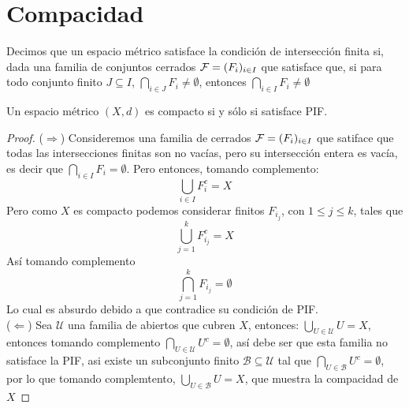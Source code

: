 \documentclass[12pt,a4paper]{book}
\begin{document}
\section{Compacidad}
\begin{defi}
Decimos que un espacio métrico satisface la condición de intersección finita si, dada una familia de conjuntos cerrados $\mathcal{F} = (F_i)_{i \in I}$
que satisface que, si para todo conjunto finito $J \subseteq I$, $\displaystyle \bigcap_{i \in J} F_i \neq \emptyset$, 
entonces $\displaystyle \bigcap_{i \in I} F_i \neq \emptyset$
\end{defi}
\begin{prop}
Un espacio métrico $(X,d)$ es compacto si y sólo si satisface PIF.
\begin{proof}
($\Rightarrow$) Consideremos una familia de cerrados  $\mathcal{F} = (F_i)_{i \in I}$ que satiface que todas las intersecciones finitas son no vacías, pero su intersección entera es vacía, es decir que  $\displaystyle \bigcap_{i \in I} F_i = \emptyset$. Pero entonces, tomando complemento:
$$\bigcup_{i \in I} F_i^c = X$$
Pero como $X$ es compacto podemos considerar finitos $F_{i_j}$, con  $ 1 \leq j \leq k$, tales que 
$$\bigcup_{j = 1}^{k} F_{i_j}^c = X$$
Así tomando complemento
$$\bigcap_{j = 1}^{k} F_{i_j} = \emptyset $$
Lo cual es absurdo debido a que contradice su condición de PIF. \\
($\Leftarrow$) Sea $\mathcal{U}$ una familia de abiertos que cubren $X$, entonces: $ \bigcup_{U \in \mathcal{U}} U = X$, entonces tomando complemento $ \displaystyle \bigcap_{U \in \mathcal{U}} U^c = \emptyset$, así debe ser que esta familia no satisface la PIF, asi existe un subconjunto finito $\mathcal{B} \subseteq \mathcal{U}$ tal que $ \displaystyle \bigcap_{U \in \mathcal{B}} U^c = \emptyset$, por lo que tomando complemtento, $ \displaystyle \bigcup_{U \in \mathcal{B}} U = X$, que muestra la compacidad de $X$
\end{proof}
\end{prop}
\end{document}
